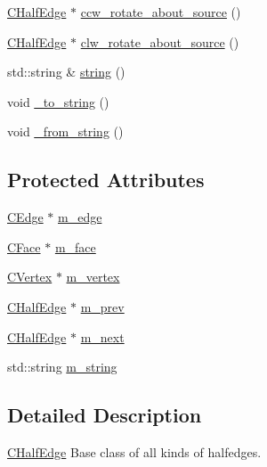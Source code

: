 \begin{DoxyCompactItemize}
\item 
\hyperlink{class_mesh_lib_1_1_c_half_edge}{C\+Half\+Edge} $\ast$ \hyperlink{class_mesh_lib_1_1_c_half_edge_a3ccd9bdf3da946ead46ec5d9c25c6057}{ccw\+\_\+rotate\+\_\+about\+\_\+source} ()
\item 
\hyperlink{class_mesh_lib_1_1_c_half_edge}{C\+Half\+Edge} $\ast$ \hyperlink{class_mesh_lib_1_1_c_half_edge_ae286b5933152133439005627e6d793a9}{clw\+\_\+rotate\+\_\+about\+\_\+source} ()
\item 
std\+::string \& \hyperlink{class_mesh_lib_1_1_c_half_edge_a05f7de73fa51af4028748232854c97c5}{string} ()
\item 
void \hyperlink{class_mesh_lib_1_1_c_half_edge_a9122b66b6a23933f223bc6571141e745}{\+\_\+to\+\_\+string} ()
\item 
void \hyperlink{class_mesh_lib_1_1_c_half_edge_a95bb31440e3af2adb42f611c0c357882}{\+\_\+from\+\_\+string} ()
\end{DoxyCompactItemize}
\subsection*{Protected Attributes}
\begin{DoxyCompactItemize}
\item 
\hyperlink{class_mesh_lib_1_1_c_edge}{C\+Edge} $\ast$ \hyperlink{class_mesh_lib_1_1_c_half_edge_a881733f71ac3dd45d2ed7b587d70ee90}{m\+\_\+edge}
\item 
\hyperlink{class_mesh_lib_1_1_c_face}{C\+Face} $\ast$ \hyperlink{class_mesh_lib_1_1_c_half_edge_a46309154e53acc173e688a8fe1299ef9}{m\+\_\+face}
\item 
\hyperlink{class_mesh_lib_1_1_c_vertex}{C\+Vertex} $\ast$ \hyperlink{class_mesh_lib_1_1_c_half_edge_acaa06714b73d14153124be09a64236c0}{m\+\_\+vertex}
\item 
\hyperlink{class_mesh_lib_1_1_c_half_edge}{C\+Half\+Edge} $\ast$ \hyperlink{class_mesh_lib_1_1_c_half_edge_a7aaae52cda7d9cf2a18c42351c27b71e}{m\+\_\+prev}
\item 
\hyperlink{class_mesh_lib_1_1_c_half_edge}{C\+Half\+Edge} $\ast$ \hyperlink{class_mesh_lib_1_1_c_half_edge_ac9688abf74f8ab58b051fd2eb3895704}{m\+\_\+next}
\item 
std\+::string \hyperlink{class_mesh_lib_1_1_c_half_edge_a1b8813067a597ad547dc8e2a9405f653}{m\+\_\+string}
\end{DoxyCompactItemize}


\subsection{Detailed Description}
\hyperlink{class_mesh_lib_1_1_c_half_edge}{C\+Half\+Edge} Base class of all kinds of halfedges. 

